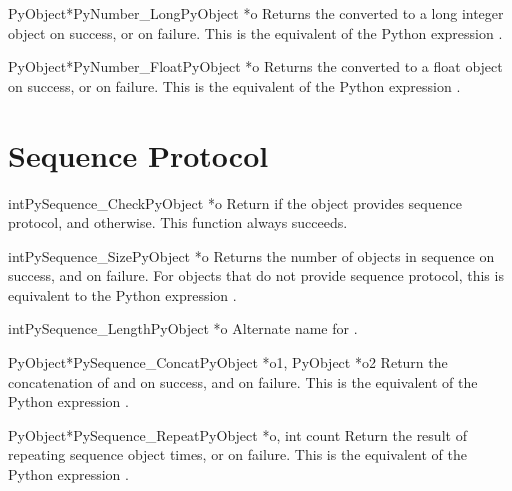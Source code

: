 \begin{cfuncdesc}{PyObject*}{PyNumber_Long}{PyObject *o}
  Returns the  converted to a long integer object on success,
  or \NULL{} on failure.  This is the equivalent of the Python
  expression .
\end{cfuncdesc}

\begin{cfuncdesc}{PyObject*}{PyNumber_Float}{PyObject *o}
  Returns the  converted to a float object on success, or
  \NULL{} on failure.  This is the equivalent of the Python expression
  .
\end{cfuncdesc}


\section{Sequence Protocol \label{sequence}}

\begin{cfuncdesc}{int}{PySequence_Check}{PyObject *o}
  Return  if the object provides sequence protocol, and
   otherwise.  This function always succeeds.
\end{cfuncdesc}

\begin{cfuncdesc}{int}{PySequence_Size}{PyObject *o}
  Returns the number of objects in sequence  on success, and
   on failure.  For objects that do not provide sequence
  protocol, this is equivalent to the Python expression
  .
\end{cfuncdesc}

\begin{cfuncdesc}{int}{PySequence_Length}{PyObject *o}
  Alternate name for .
\end{cfuncdesc}

\begin{cfuncdesc}{PyObject*}{PySequence_Concat}{PyObject *o1, PyObject *o2}
  Return the concatenation of  and  on success, and
  \NULL{} on failure.   This is the equivalent of the Python
  expression .
\end{cfuncdesc}


\begin{cfuncdesc}{PyObject*}{PySequence_Repeat}{PyObject *o, int count}
  Return the result of repeating sequence object  
  times, or \NULL{} on failure.  This is the equivalent of the Python
  expression .
\end{cfuncdesc}

